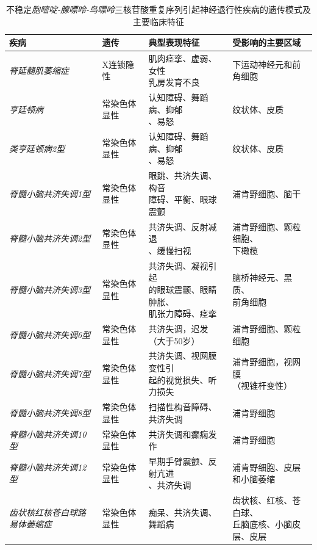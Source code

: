 \begin{table}[htbp]
	\caption{不稳定\textit{胞嘧啶-腺嘌呤-鸟嘌呤}三核苷酸重复序列引起神经退行性疾病的遗传模式及主要临床特征} \label{tab:63_1} \centering
	\begin{tabular}{llll}
		\toprule
		疾病 & 遗传 & 典型表现特征 & 受影响的主要区域\\
		\midrule
		\textit{脊延髓肌萎缩症} & X连锁隐性 & \makecell{肌肉痉挛、虚弱、女性\\乳房发育不良} & 下运动神经元和前角细胞 \\
		\textit{亨廷顿病} & 常染色体显性 & \makecell{认知障碍、舞蹈病、抑郁\\、易怒} & 纹状体、皮质 \\
		\textit{类亨廷顿病2型} & 常染色体显性 & \makecell{认知障碍、舞蹈病、抑郁\\、易怒} & 纹状体、皮质 \\
		\textit{脊髓小脑共济失调1型} & 常染色体显性 & \makecell{眼跳、共济失调、构音\\障碍、平衡、眼球震颤} & 浦肯野细胞、脑干 \\
		\textit{脊髓小脑共济失调2型} & 常染色体显性 & \makecell{共济失调、反射减退\\、缓慢扫视} & \makecell{浦肯野细胞、颗粒细胞、\\下橄榄} \\
		\textit{脊髓小脑共济失调3型} & 常染色体显性 & \makecell{共济失调、凝视引起\\的眼球震颤、眼睛肿胀、\\肌张力障碍、痉挛} & \makecell{脑桥神经元、黑质、\\前角细胞} \\
		\textit{脊髓小脑共济失调6型} & 常染色体显性 & \makecell{共济失调，迟发\\（大于50岁）} & 浦肯野细胞、颗粒细胞 \\
		\textit{脊髓小脑共济失调7型} & 常染色体显性 & \makecell{共济失调、视网膜变性引\\起的视觉损失、听力损失} & \makecell{浦肯野细胞，视网膜\\（视锥杆变性）} \\
		\textit{脊髓小脑共济失调8型} & 常染色体显性 & 扫描性构音障碍、共济失调 & 浦肯野细胞 \\
		\textit{脊髓小脑共济失调10型} & 常染色体显性 & 共济失调和癫痫发作 & 浦肯野细胞 \\
		\textit{脊髓小脑共济失调12型} & 常染色体显性 & \makecell{早期手臂震颤、反射亢进\\、共济失调} & \makecell{浦肯野细胞、皮层\\和小脑萎缩} \\
		\textit{齿状核红核苍白球路易体萎缩症} & 常染色体显性 & 痴呆、共济失调、舞蹈病 & \makecell{齿状核、红核、苍白球、\\丘脑底核、小脑皮层、皮层} \\
		\bottomrule
	\end{tabular}
\end{table}


